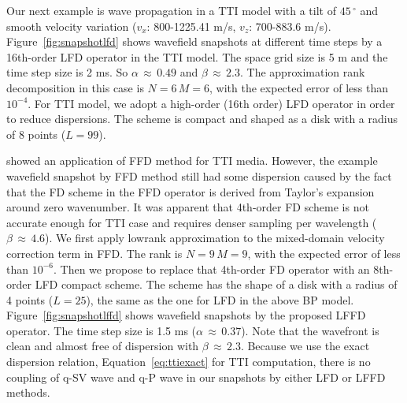 {

Our next example is wave propagation in a TTI model with a tilt of $45\,^{\circ}$ and smooth velocity variation ($v_x$: 800-1225.41 m/s, $v_z$: 700-883.6 m/s). 
Figure~\ref{fig:snapshotlfd} shows wavefield snapshots at different time steps by a 16th-order LFD operator 
in the TTI model. 
The space grid size is 5 m and the time step size is 2 ms.
So $\alpha\,\approx\,0.49$ and $\beta\,\approx\,2.3$.
The approximation
rank decomposition in this case is $N=6\, M=6$, with the expected error of
less than $10^{-4}$.
For TTI model, we adopt a high-order (16th order) LFD operator in order to reduce dispersions. 
The scheme is compact and shaped as a disk with a radius of 8 points ($L=99$).


\cite{songx} showed an application of FFD method for TTI media. 
However, the example wavefield snapshot by FFD method still had some dispersion
caused by the fact that the FD scheme in the FFD operator is derived from Taylor's expansion around zero wavenumber. 
It was apparent that 4th-order FD scheme is not accurate enough for TTI case
and requires denser sampling per wavelength ($\beta\,\approx\,4.6$).
We first apply lowrank approximation
to the mixed-domain velocity correction term in FFD.
The rank  is $N=9\, M=9$, with the expected error of
less than $10^{-6}$.
Then we propose to replace that 4th-order FD operator with an 8th-order LFD compact scheme. 
The scheme has the shape of a disk with a radius of 4 points ($L=25$), the same as the one for LFD in the above BP model.
Figure~\ref{fig:snapshotlffd} shows wavefield snapshots by the proposed LFFD operator. 
The time step size is 1.5 ms ($\alpha\,\approx\,0.37$).
Note that the wavefront is clean and almost free of dispersion with $\beta\,\approx\,2.3$.
Because we use the exact dispersion relation, Equation~\ref{eq:ttiexact} for TTI computation,
there is no coupling of q-SV wave and q-P wave \cite[]{grechkat,zhang2,duveneckt} in our snapshots by either LFD or LFFD methods. 

}
